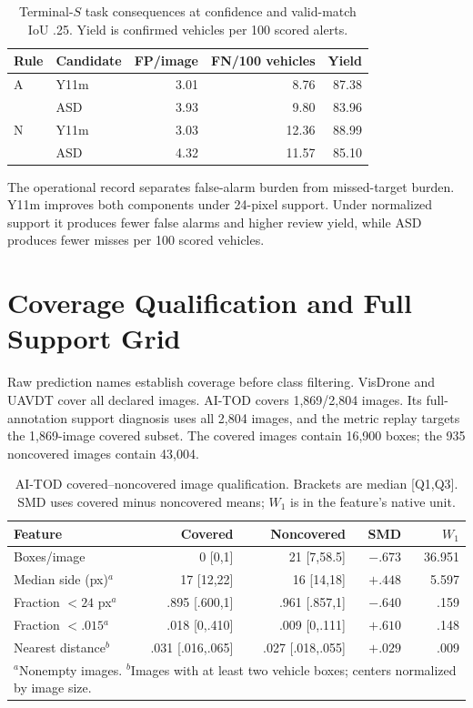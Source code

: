 \documentclass[journal]{IEEEtran}
\begin{document}
\begin{table}[!t]
\centering
\caption{Terminal-$S$ task consequences at confidence and valid-match IoU .25. Yield is confirmed vehicles per 100 scored alerts.}\label{tab:task-consequence}
\scriptsize
\setlength{\tabcolsep}{2.5pt}\renewcommand{\arraystretch}{.98}
\begin{tabular}{llrrr}
\toprule
Rule & Candidate & FP/image & FN/100 vehicles & Yield\\
\midrule
A & Y11m & 3.01 & 8.76 & 87.38\\
  & ASD  & 3.93 & 9.80 & 83.96\\
N & Y11m & 3.03 & 12.36 & 88.99\\
  & ASD  & 4.32 & 11.57 & 85.10\\
\bottomrule
\end{tabular}
\end{table}

The operational record separates false-alarm burden from missed-target burden. Y11m improves both components under 24-pixel support. Under normalized support it produces fewer false alarms and higher review yield, while ASD produces fewer misses per 100 scored vehicles.

\section{Coverage Qualification and Full Support Grid}
Raw prediction names establish coverage before class filtering. VisDrone and UAVDT cover all declared images. AI-TOD covers 1,869/2,804 images. Its full-annotation support diagnosis uses all 2,804 images, and the metric replay targets the 1,869-image covered subset. The covered images contain 16,900 boxes; the 935 noncovered images contain 43,004.

\begin{table}[!t]
\centering
\caption{AI-TOD covered--noncovered image qualification. Brackets are median [Q1,Q3]. SMD uses covered minus noncovered means; $W_1$ is in the feature's native unit.}\label{tab:coverage}
\tiny
\setlength{\tabcolsep}{1.5pt}\renewcommand{\arraystretch}{1.04}
\begin{tabular}{lrrrr}
\toprule
Feature & Covered & Noncovered & SMD & $W_1$\\
\midrule
Boxes/image & 0 [0,1] & 21 [7,58.5] & $-.673$ & 36.951\\
Median side (px)$^a$ & 17 [12,22] & 16 [14,18] & $+.448$ & 5.597\\
Fraction $<24$ px$^a$ & .895 [.600,1] & .961 [.857,1] & $-.640$ & .159\\
Fraction $<.015$$^a$ & .018 [0,.410] & .009 [0,.111] & $+.610$ & .148\\
Nearest distance$^b$ & .031 [.016,.065] & .027 [.018,.055] & $+.029$ & .009\\
\bottomrule
\multicolumn{5}{p{.96\columnwidth}}{\scriptsize $^a$Nonempty images. $^b$Images with at least two vehicle boxes; centers normalized by image size.}
\end{tabular}
\end{table}
\end{document}
